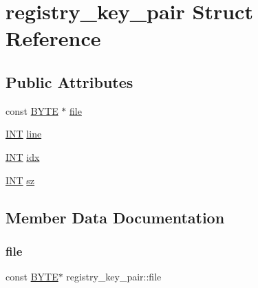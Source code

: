 \hypertarget{structregistry__key__pair}{}\section{registry\+\_\+key\+\_\+pair Struct Reference}
\label{structregistry__key__pair}
\subsection*{Public Attributes}
\begin{DoxyCompactItemize}
\item 
const \mbox{\hyperlink{galois_8h_ab6cc7b4aeb6ea31aba2b3fbfc83ff5e6}{B\+Y\+TE}} $\ast$ \mbox{\hyperlink{structregistry__key__pair_a9326374e2cb55c341b93d84dacffad15}{file}}
\item 
\mbox{\hyperlink{galois_8h_a09fddde158a3a20bd2dcadb609de11dc}{I\+NT}} \mbox{\hyperlink{structregistry__key__pair_ad98d25e4748e98dd357d85c646d3f11c}{line}}
\item 
\mbox{\hyperlink{galois_8h_a09fddde158a3a20bd2dcadb609de11dc}{I\+NT}} \mbox{\hyperlink{structregistry__key__pair_aa7f879a2ddbf01d1f19d2b12a9b14c88}{idx}}
\item 
\mbox{\hyperlink{galois_8h_a09fddde158a3a20bd2dcadb609de11dc}{I\+NT}} \mbox{\hyperlink{structregistry__key__pair_a0a6af774d4bb1546462d33d24ee99433}{sz}}
\end{DoxyCompactItemize}


\subsection{Member Data Documentation}
\mbox{\label{structregistry__key__pair_a9326374e2cb55c341b93d84dacffad15}} 
\subsubsection{\texorpdfstring{file}{file}}
{\footnotesize\ttfamily const \mbox{\hyperlink{galois_8h_ab6cc7b4aeb6ea31aba2b3fbfc83ff5e6}{B\+Y\+TE}}$\ast$ registry\+\_\+key\+\_\+pair\+::file}

\mbox{\label{structregistry__key__pair_aa7f879a2ddbf01d1f19d2b12a9b14c88}} 
